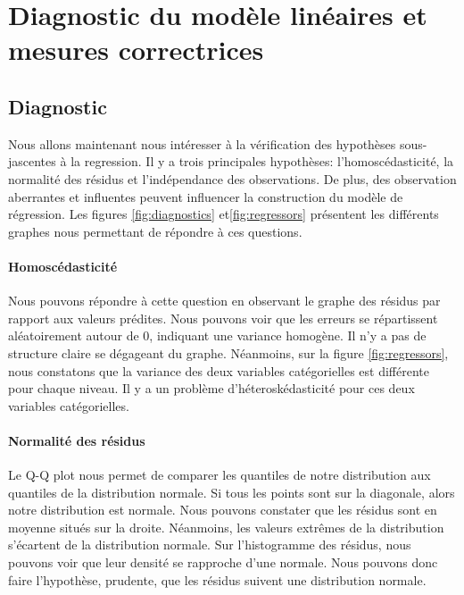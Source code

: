\documentclass[11pt,a4paper]{article}
\begin{document}
\section{Diagnostic du modèle linéaires et mesures correctrices}
\subsection{Diagnostic}
Nous allons maintenant nous intéresser à la vérification des hypothèses sous-jascentes à la regression.
Il y a trois principales hypothèses: l'homoscédasticité, la normalité des résidus et l'indépendance des observations. De plus, des observation aberrantes et influentes peuvent influencer la construction du modèle de régression. Les figures \ref{fig:diagnostics} et\ref{fig:regressors} présentent les différents graphes nous permettant de répondre à ces questions.

\paragraph{Homoscédasticité} Nous pouvons répondre à cette question en observant le graphe des résidus par rapport aux valeurs prédites. Nous pouvons voir que les erreurs se répartissent aléatoirement autour de 0, indiquant une variance homogène. Il n'y a pas de structure claire se dégageant du graphe.
Néanmoins, sur la figure \ref{fig:regressors}, nous constatons que la variance des deux variables catégorielles est différente pour chaque niveau. Il y a un problème d'héteroskédasticité pour ces deux variables catégorielles.
\paragraph{Normalité des résidus} Le Q-Q plot nous permet de comparer les quantiles de notre distribution aux quantiles de la distribution normale. Si tous les points sont sur la diagonale, alors notre distribution est normale. Nous pouvons constater que les résidus sont en moyenne situés sur la droite. Néanmoins, les valeurs extrêmes de la distribution s'écartent de la distribution normale. Sur l'histogramme des résidus, nous pouvons voir que leur densité se rapproche d'une normale. Nous pouvons donc faire l'hypothèse, prudente, que les résidus suivent une distribution normale.
\end{document}

